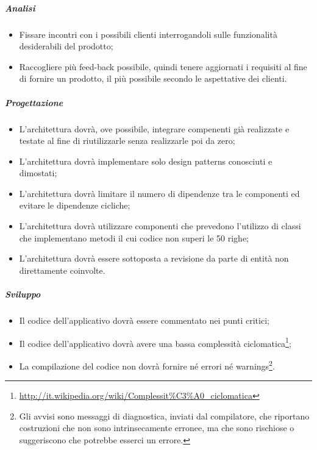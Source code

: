 \subparagraph{Analisi}
\begin{itemize}
\item Fissare incontri con i possibili clienti interrogandoli sulle funzionalit\`{a} desiderabili del prodotto;
\item Raccogliere pi\`{u} feed-back possibile, quindi tenere aggiornati i requisiti al fine di fornire un prodotto, il pi\`{u} possibile secondo le aspettative dei clienti.
\end{itemize}
\subparagraph{Progettazione}
\begin{itemize}
\item L\textquoteright{}architettura dovr\`{a}, ove possibile, integrare compenenti gi\`{a} realizzate e testate al fine di riutilizzarle senza realizzarle poi da zero;
\item L\textquoteright{}architettura dovr\`{a} implementare solo design patterns conosciuti e dimostati;
\item L\textquoteright{}architettura dovr\`{a} limitare il numero di dipendenze tra le componenti ed evitare le dipendenze cicliche;
\item L\textquoteright{}architettura dovr\`{a} utilizzare componenti che prevedono l\textquoteright{}utilizzo di classi che implementano metodi il cui codice non superi le 50 righe;
\item L\textquoteright{}architettura dovr\`{a} essere sottoposta a revisione da parte di entit\`{a} non direttamente coinvolte.
\end{itemize}
\subparagraph{Sviluppo}
\begin{itemize}
\item Il codice dell\textquoteright{}applicativo dovr\`{a} essere commentato nei punti critici;
\item Il codice dell\textquoteright{}applicativo dovr\`{a} avere una bassa complessit\`{a} ciclomatica\footnote{\url{http://it.wikipedia.org/wiki/Complessit\%C3\%A0\_ciclomatica}};
\item La compilazione del codice non dovr\`{a} fornire né errori né warnings\footnote{Gli avvisi sono messaggi di diagnostica, inviati dal compilatore, che riportano costruzioni che non sono intrinsecamente erronee, ma che sono rischiose o suggeriscono che potrebbe esserci un errore.}.
\end{itemize}